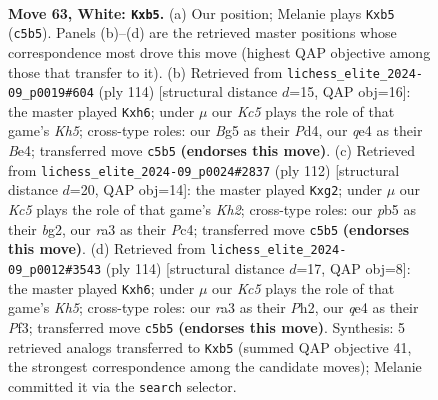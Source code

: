 \documentclass[11pt]{article}
\begin{document}
\clearpage

\begin{figure}[p]\centering
\begin{subfigure}{0.46\textwidth}\centering
\resizebox{\linewidth}{!}{%
\newchessgame
\chessboard[
  setfen={8/3k4/3P4/1pK3Br/4q3/r7/8/8 w - - 2 63},
  showmover=false,
  pgfstyle=straightmove, color=movearrow, markmove={c5-b5}
]}
\caption{}
\end{subfigure}\hfill
\begin{subfigure}{0.46\textwidth}\centering
\resizebox{\linewidth}{!}{%
\newchessgame
\chessboard[
  setfen={8/8/7p/7K/r2PB2P/6k1/8/8 w - - 0 58},
  showmover=false,
  pgfstyle=straightmove, color=movearrow, markmove={h5-h6}
]}
\caption{}
\end{subfigure}
\\[4pt]
\begin{subfigure}{0.46\textwidth}\centering
\resizebox{\linewidth}{!}{%
\newchessgame
\chessboard[
  setfen={2k5/8/1B2r3/5R2/2P4p/7P/6bK/8 w - - 0 57},
  showmover=false,
  pgfstyle=straightmove, color=movearrow, markmove={h2-g2}
]}
\caption{}
\end{subfigure}\hfill
\begin{subfigure}{0.46\textwidth}\centering
\resizebox{\linewidth}{!}{%
\newchessgame
\chessboard[
  setfen={8/8/7p/r4B1K/8/5P2/3k3P/8 w - - 4 58},
  showmover=false,
  pgfstyle=straightmove, color=movearrow, markmove={h5-h6}
]}
\caption{}
\end{subfigure}
\caption{\textbf{Move 63, White: \texttt{Kxb5}.} (a) Our position; Melanie plays \texttt{Kxb5} (\texttt{c5b5}). Panels (b)--(d) are the retrieved master positions whose correspondence most drove this move (highest QAP objective among those that transfer to it). (b) Retrieved from \texttt{lichess\_elite\_2024-09\_p0019\#604} (ply 114) [structural distance $d$=15, QAP obj=16]: the master played \texttt{Kxh6}; under $\mu$ our \emph{Kc5} plays the role of that game's \emph{Kh5}; cross-type roles: our \emph{B}g5 as their \emph{P}d4, our \emph{q}e4 as their \emph{B}e4; transferred move \texttt{c5b5} \textbf{(endorses this move)}. (c) Retrieved from \texttt{lichess\_elite\_2024-09\_p0024\#2837} (ply 112) [structural distance $d$=20, QAP obj=14]: the master played \texttt{Kxg2}; under $\mu$ our \emph{Kc5} plays the role of that game's \emph{Kh2}; cross-type roles: our \emph{p}b5 as their \emph{b}g2, our \emph{r}a3 as their \emph{P}c4; transferred move \texttt{c5b5} \textbf{(endorses this move)}. (d) Retrieved from \texttt{lichess\_elite\_2024-09\_p0012\#3543} (ply 114) [structural distance $d$=17, QAP obj=8]: the master played \texttt{Kxh6}; under $\mu$ our \emph{Kc5} plays the role of that game's \emph{Kh5}; cross-type roles: our \emph{r}a3 as their \emph{P}h2, our \emph{q}e4 as their \emph{P}f3; transferred move \texttt{c5b5} \textbf{(endorses this move)}. Synthesis: 5 retrieved analogs transferred to \texttt{Kxb5} (summed QAP objective 41, the strongest correspondence among the candidate moves); Melanie committed it via the \texttt{search} selector.}
\label{fig:thought-m124}
\end{figure}
\end{document}
